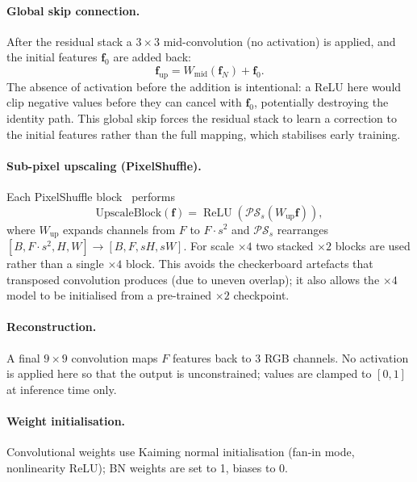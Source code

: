 \documentclass{article}
\begin{document}
\paragraph{Global skip connection.}
After the residual stack a $3{\times}3$ mid-convolution (no activation) is
applied, and the initial features $\mathbf{f}_0$ are added back:
\begin{equation}
  \mathbf{f}_{\text{up}} = W_{\text{mid}}\!\left(\mathbf{f}_N\right) + \mathbf{f}_0.
\end{equation}
The absence of activation before the addition is intentional: a ReLU here
would clip negative values before they can cancel with $\mathbf{f}_0$, potentially
destroying the identity path.
This global skip forces the residual stack to learn a correction to the
initial features rather than the full mapping, which stabilises early training.

\paragraph{Sub-pixel upscaling (PixelShuffle).}
Each PixelShuffle block~\cite{shi2016real} performs
\begin{equation}
  \text{UpscaleBlock}(\mathbf{f}) =
  \operatorname{ReLU}\!\left(
    \mathcal{PS}_s\!\left(W_{\text{up}} \mathbf{f}\right)
  \right),
\end{equation}
where $W_{\text{up}}$ expands channels from $F$ to $F \cdot s^2$ and
$\mathcal{PS}_s$ rearranges
$[B, F{\cdot}s^2, H, W] \to [B, F, sH, sW]$.
For scale $\times 4$ two stacked $\times 2$ blocks are used rather than a
single $\times 4$ block.
This avoids the checkerboard artefacts that transposed convolution produces
(due to uneven overlap); it also allows the $\times 4$ model to be initialised
from a pre-trained $\times 2$ checkpoint.

\paragraph{Reconstruction.}
A final $9{\times}9$ convolution maps $F$ features back to 3 RGB channels.
No activation is applied here so that the output is unconstrained; values
are clamped to $[0,1]$ at inference time only.

\paragraph{Weight initialisation.}
Convolutional weights use Kaiming normal initialisation (fan-in mode,
nonlinearity ReLU); BN weights are set to 1, biases to 0.
\end{document}
